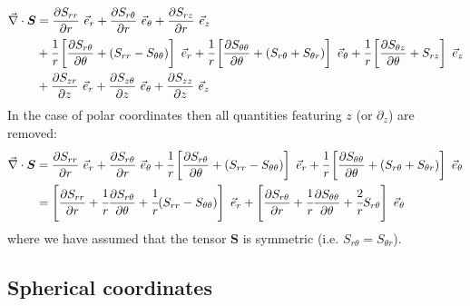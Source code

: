\begin{align}
{\vec\nabla}\cdot {\bm S} & = \frac{\partial S_{rr}}{\partial r}~\vec{e}_r 
+ \frac{\partial S_{r\theta}}{\partial r}~\vec{e}_\theta
+ \frac{\partial S_{rz}}{\partial r}~\vec{e}_z  \nonumber\\
&  + \cfrac{1}{r}\left[\frac{\partial S_{r \theta}}{\partial \theta} + (S_{rr}-S_{\theta\theta})\right]~\vec{e}_r  +
\cfrac{1}{r}\left[\frac{\partial S_{\theta\theta}}{\partial \theta} + (S_{r\theta}+S_{\theta r})\right]~\vec{e}_\theta   +\cfrac{1}{r}\left[\frac{\partial S_{\theta z}}{\partial \theta} + S_{rz}\right]~\vec{e}_z \nonumber\\
 &  +
\frac{\partial S_{zr}}{\partial z}~\vec{e}_r +
\frac{\partial S_{z\theta}}{\partial z}~\vec{e}_\theta +
\frac{\partial S_{zz}}{\partial z}~\vec{e}_z \nonumber
\end{align}
In the case of polar coordinates then all quantities featuring $z$ (or $\partial_z$) are removed:
\begin{align}
{\vec\nabla}\cdot {\bm S} 
& = \frac{\partial S_{rr}}{\partial r}~\vec{e}_r 
+ \frac{\partial S_{r\theta}}{\partial r}~\vec{e}_\theta
+ \cfrac{1}{r}\left[\frac{\partial S_{r \theta}}{\partial \theta} + (S_{rr}-S_{\theta\theta})\right]~\vec{e}_r  +
\cfrac{1}{r}\left[\frac{\partial S_{\theta\theta}}{\partial \theta} + (S_{r\theta}+S_{\theta r})\right]~\vec{e}_\theta \nonumber\\
& = \left[\frac{\partial S_{rr}}{\partial r} +
\cfrac{1}{r} \frac{\partial S_{r \theta}}{\partial \theta}
+ \cfrac{1}{r} (S_{rr}-S_{\theta\theta})
\right] ~\vec{e}_r
+ \left[
\frac{\partial S_{r\theta}}{\partial r}
+\cfrac{1}{r} \frac{\partial S_{\theta\theta}}{\partial \theta}
+\cfrac{2}{r}  S_{r\theta}
\right]~\vec{e}_\theta
\label{eq:divtensor}
\end{align}
where we have assumed that the tensor ${\bm S}$ is symmetric (i.e. $S_{r\theta}=S_{\theta r}$).




\subsection{Spherical coordinates \label{ss:sphercoord}}

